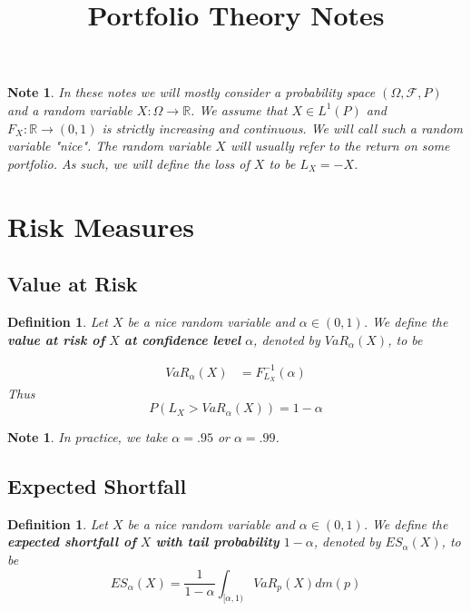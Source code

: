 \documentclass[12pt]{amsart}
\newtheorem{defn}[thm]{Definition}
\newtheorem{note}[thm]{Note}
\newcommand{\al}{\alpha}
\newcommand{\Om}{\Omega}
\newcommand{\R}{\mathbb{R}}
\newcommand{\MF}{\mathcal{F}}
\begin{document}
\title{Portfolio Theory Notes}
\maketitle

\tableofcontents

\begin{note}
In these notes we will mostly consider a probability space $(\Om, \MF, P)$ and a random variable $X: \Om \rightarrow \R$. We assume that $X \in L^1(P)$ and $F_X:\R \rightarrow (0,1)$ is strictly increasing and continuous. We will call such a random variable "nice". The random variable $X$ will usually refer to the return on some portfolio. As such, we will define the loss of $X$ to be $L_X = -X$.
\end{note}

\section{Risk Measures}

\subsection{Value at Risk}

\begin{defn}
Let $X$ be a nice random variable and $\al \in (0,1)$. We define the \textbf{value at risk of } $X$ \textbf{at confidence level } $\al$, denoted by $VaR_{\al}(X)$, to be 

\begin{align*}
VaR_{\al}(X) 
&= F^{-1}_{L_X}(\al)
\end{align*}
Thus $$P(L_X > VaR_{\al}(X)) = 1- \al$$
\end{defn}

\begin{note}
In practice, we take $\al= .95$ or $\al= .99$. 
\end{note}

\subsection{Expected Shortfall}

 \begin{defn}
Let $X$ be a nice random variable and $\al\in (0,1)$. We define the \textbf{expected shortfall of } $X$ \textbf{with tail probability } $1-\al$, denoted by $ES_{\al}(X)$, to be $$ES_{\al}(X) = \frac{1}{1-\al}\int_{[\al,1)}VaR_p(X)dm(p)$$
\end{defn}
\end{document}
